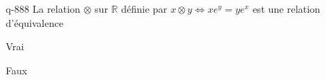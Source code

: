 \begin{truefalse}{q-888}
La relation $\otimes$ sur $\mathbb R$ définie par $x\otimes y \iff xe^{y}=ye^{x}$ est une relation d'équivalence
\item* Vrai
\item Faux
\end{truefalse}

